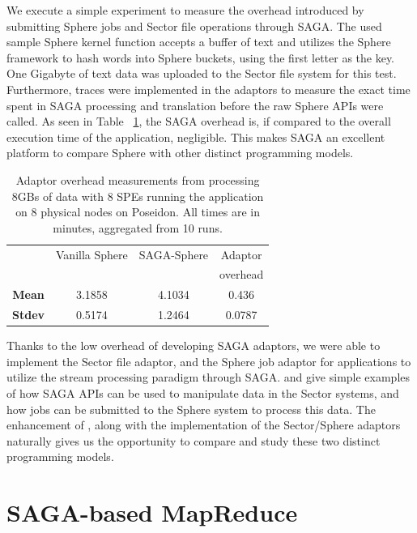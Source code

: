 \documentclass[3p,twocolumn]{elsarticle}
\begin{document}
We execute a simple experiment to measure the overhead introduced by
submitting Sphere jobs and Sector file operations through SAGA.  The
used sample Sphere kernel function accepts a buffer of text and
utilizes the Sphere framework to hash words into Sphere buckets, using
the first letter as the key. One Gigabyte of text data was uploaded to
the Sector file system for this test.  Furthermore, traces were
implemented in the adaptors to measure the exact time spent in SAGA
processing and translation before the raw Sphere APIs were called.  As
seen in Table ~\ref{tab:sphere_overhead}, the SAGA overhead is, if compared
to the overall execution time of the application, negligible.
This makes SAGA an excellent platform to compare Sphere with other distinct
programming models.

\begin{table}[h!]
  \footnotesize
  \begin{tabular}{cccc}
    \hline
    & Vanilla Sphere &  SAGA-Sphere & Adaptor \\
    &                &              & overhead \\
    \hline
    { {\bf Mean}} & 3.1858 & 4.1034 & 0.436 \\
    \hline 
    { {\bf Stdev}} & 0.5174 & 1.2464 & 0.0787 \\
    \hline \hline
  \end{tabular}
  \caption{Adaptor overhead measurements from processing 8GBs of data with 8
  SPEs running the \wc application on 8 physical nodes on Poseidon.
  All times are in minutes, aggregated from 10 runs.\uppp
  \label{tab:sphere_overhead}}
\end{table}


Thanks to the low overhead of developing SAGA adaptors, we were able
to implement the Sector file adaptor, and the Sphere job adaptor for
applications to utilize the stream processing paradigm through SAGA.
 and  give simple examples of how SAGA APIs
can be used to manipulate data in the Sector systems, and how jobs can
be submitted to the Sphere system to process this data.  The
enhancement of \sagamapreduce, along with the implementation of the
Sector/Sphere adaptors naturally gives us the opportunity to compare
and study these two distinct programming models.


\section{SAGA-based MapReduce}
\label{sec:mr}
\end{document}
